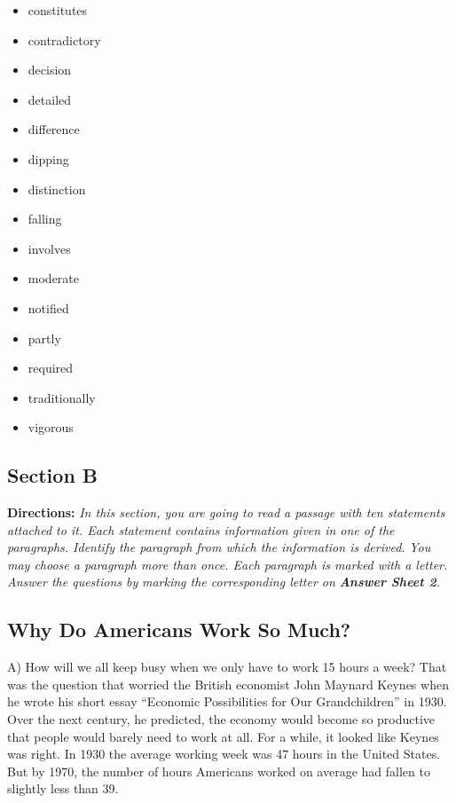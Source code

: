 \documentclass[UTF8,11pt]{ctexart}
\begin{document}
\begin{itemize}[leftmargin=2em,itemsep=.2em,topsep=.4em]\item[A.] constitutes
\item[B.] contradictory
\item[C.] decision
\item[D.] detailed
\item[E.] difference
\item[F.] dipping
\item[G.] distinction
\item[H.] falling
\item[I.] involves
\item[J.] moderate
\item[K.] notified
\item[L.] partly
\item[M.] required
\item[N.] traditionally
\item[O.] vigorous
\end{itemize}

\subsection*{\textbf{Section B}}


\textbf{Directions:} \textit{In this section, you are going to read a passage with ten statements attached to it. Each statement} \textit{contains information given in one of the paragraphs. Identify the paragraph from which the information is derived.} \textit{You may choose a paragraph more than once. Each paragraph is marked with a letter. Answer the questions by} \textit{marking the corresponding letter on }\textbf{\textit{Answer Sheet 2}}\textit{.}


\subsection*{\textbf{Why Do Americans Work So Much?}}


A) How will we all keep busy when we only have to work 15 hours a week? That was the question that worried the British economist John Maynard Keynes when he wrote his short essay “Economic Possibilities for Our Grandchildren” in 1930. Over the next century, he predicted, the economy would become so productive that people would barely need to work at all. For a while, it looked like Keynes was right. In 1930 the average working week was 47 hours in the United States. But by 1970, the number of hours Americans worked on average had fallen to slightly less than 39.
\end{document}

